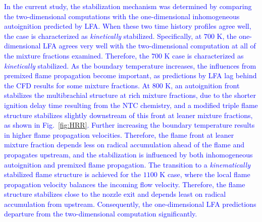 \documentclass[review,3p,times]{elsarticle}
\begin{document}
\textcolor{blue}{In the current study, the stabilization mechanism was determined by comparing the two-dimensional computations with the one-dimensional inhomogeneous autoignition predicted by LFA.  When these two time history profiles agree well, the case is characterized as \emph{kinetically} stabilized.  Specifically, at $700$ K, the one-dimensional LFA agrees very well with the two-dimensional computation at all of the mixture fractions examined.  Therefore, the $700$ K case is characterized as \emph{kinetically} stabilized.  As the boundary temperature increases, the influences from premixed flame propagation become important, as predictions by LFA lag behind the CFD results for some mixture fractions.  At $800$ K, an autoignition front stabilizes the multibrachial structure at rich mixture fractions, due to the shorter ignition delay time resulting from the NTC chemistry, and a modified triple flame structure stabilizes slightly downstream of this front at leaner mixture fractions, as shown in Fig.~\ref{fig:HRR}.  Further increasing the boundary temperature results in higher flame propagation velocities.  Therefore, the flame front at leaner mixture fraction depends less on radical accumulation ahead of the flame and propagates upstream, and the stabilization is influenced by both inhomogeneous autoignition and premixed flame propagation.  The transition to a \emph {kinematically} stabilized flame structure is achieved for the $1100$ K case, where the local flame propagation velocity balances the incoming flow velocity.  Therefore, the flame structure stabilizes close to the nozzle exit and depends least on radical accumulation from upstream.  Consequently, the one-dimensional LFA predictions departure from the two-dimensional computation significantly.}
\end{document}
